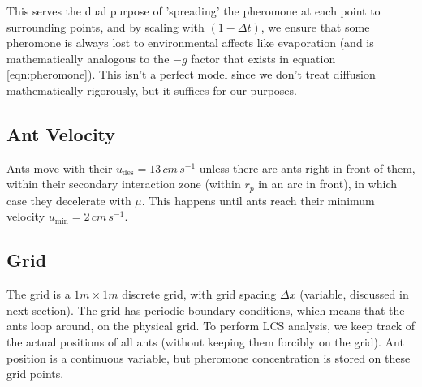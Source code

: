 This serves the dual purpose of 'spreading' the pheromone at each point to surrounding points, and by scaling with $(1 - \Delta t)$, we ensure that some pheromone is always lost to environmental affects like evaporation (and is mathematically analogous to the $- g$ factor that exists in equation \ref{eqn:pheromone}). This isn't a perfect model since we don't treat diffusion mathematically rigorously, but it suffices for our purposes.

\subsection{Ant Velocity}

Ants move with their $u_{\text{des}} = 13 \, cm \, s^{-1}$ unless there are ants right in front of them, within their secondary interaction zone (within $r_p$ in an arc in front), in which case they decelerate with $\mu$. This happens until ants reach their minimum velocity $u_{\text{min}} = 2 \, cm \, s^{-1}$.

\subsection{Grid}

The grid is a $1m \times 1m$ discrete grid, with grid spacing $\Delta x$ (variable, discussed in next section). The grid has periodic boundary conditions, which means that the ants loop around, on the physical grid. To perform LCS analysis, we keep track of the actual positions of all ants (without keeping them forcibly on the grid). Ant position is a continuous variable, but pheromone concentration is stored on these grid points. 
